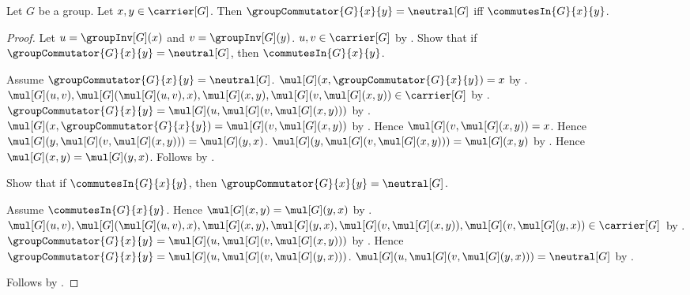 \begin{theorem}\label{group_commutator_neutral_iff_commutes}
    Let $G$ be a group.
    Let $x,y\in\carrier[G]$.
    Then $\groupCommutator{G}{x}{y}=\neutral[G]$ iff
        $\commutesIn{G}{x}{y}$.
\end{theorem}
\begin{proof}
    Let $u=\groupInv[G](x)$ and $v=\groupInv[G](y)$.
    $u,v\in\carrier[G]$ by .
    Show that if $\groupCommutator{G}{x}{y}=\neutral[G]$, then
        $\commutesIn{G}{x}{y}$.
    \begin{subproof}
        Assume $\groupCommutator{G}{x}{y}=\neutral[G]$.
        $\mul[G](x,\groupCommutator{G}{x}{y})=x$ by
            .
        $\mul[G](u,v),\mul[G](\mul[G](u,v),x),
            \mul[G](x,y),\mul[G](v,\mul[G](x,y))\in\carrier[G]$ by
            .
        $\groupCommutator{G}{x}{y}=
            \mul[G](u,\mul[G](v,\mul[G](x,y)))$ by
            .
        $\mul[G](x,\groupCommutator{G}{x}{y})=
            \mul[G](v,\mul[G](x,y))$ by
            .
        Hence $\mul[G](v,\mul[G](x,y))=x$.
        Hence $\mul[G](y,\mul[G](v,\mul[G](x,y)))=
            \mul[G](y,x)$.
        $\mul[G](y,\mul[G](v,\mul[G](x,y)))=
            \mul[G](x,y)$ by
            .
        Hence $\mul[G](x,y)=\mul[G](y,x)$.
        Follows by .
    \end{subproof}
    Show that if $\commutesIn{G}{x}{y}$, then
        $\groupCommutator{G}{x}{y}=\neutral[G]$.
    \begin{subproof}
        Assume $\commutesIn{G}{x}{y}$.
        Hence $\mul[G](x,y)=\mul[G](y,x)$ by .
        $\mul[G](u,v),\mul[G](\mul[G](u,v),x),
            \mul[G](x,y),\mul[G](y,x),
            \mul[G](v,\mul[G](x,y)),
            \mul[G](v,\mul[G](y,x))\in\carrier[G]$ by
            .
        $\groupCommutator{G}{x}{y}=
            \mul[G](u,\mul[G](v,\mul[G](x,y)))$ by
            .
        Hence $\groupCommutator{G}{x}{y}=
            \mul[G](u,\mul[G](v,\mul[G](y,x)))$.
        $\mul[G](u,\mul[G](v,\mul[G](y,x)))=
            \neutral[G]$ by
            .
    \end{subproof}
    Follows by \auto.
\end{proof}

